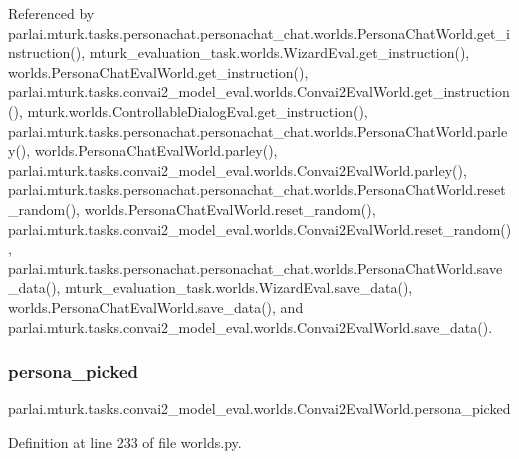 Referenced by parlai.\+mturk.\+tasks.\+personachat.\+personachat\+\_\+chat.\+worlds.\+Persona\+Chat\+World.\+get\+\_\+instruction(), mturk\+\_\+evaluation\+\_\+task.\+worlds.\+Wizard\+Eval.\+get\+\_\+instruction(), worlds.\+Persona\+Chat\+Eval\+World.\+get\+\_\+instruction(), parlai.\+mturk.\+tasks.\+convai2\+\_\+model\+\_\+eval.\+worlds.\+Convai2\+Eval\+World.\+get\+\_\+instruction(), mturk.\+worlds.\+Controllable\+Dialog\+Eval.\+get\+\_\+instruction(), parlai.\+mturk.\+tasks.\+personachat.\+personachat\+\_\+chat.\+worlds.\+Persona\+Chat\+World.\+parley(), worlds.\+Persona\+Chat\+Eval\+World.\+parley(), parlai.\+mturk.\+tasks.\+convai2\+\_\+model\+\_\+eval.\+worlds.\+Convai2\+Eval\+World.\+parley(), parlai.\+mturk.\+tasks.\+personachat.\+personachat\+\_\+chat.\+worlds.\+Persona\+Chat\+World.\+reset\+\_\+random(), worlds.\+Persona\+Chat\+Eval\+World.\+reset\+\_\+random(), parlai.\+mturk.\+tasks.\+convai2\+\_\+model\+\_\+eval.\+worlds.\+Convai2\+Eval\+World.\+reset\+\_\+random(), parlai.\+mturk.\+tasks.\+personachat.\+personachat\+\_\+chat.\+worlds.\+Persona\+Chat\+World.\+save\+\_\+data(), mturk\+\_\+evaluation\+\_\+task.\+worlds.\+Wizard\+Eval.\+save\+\_\+data(), worlds.\+Persona\+Chat\+Eval\+World.\+save\+\_\+data(), and parlai.\+mturk.\+tasks.\+convai2\+\_\+model\+\_\+eval.\+worlds.\+Convai2\+Eval\+World.\+save\+\_\+data().

\mbox{\label{classparlai_1_1mturk_1_1tasks_1_1convai2__model__eval_1_1worlds_1_1Convai2EvalWorld_a747806364239c2320520755980c9166f}} 
\subsubsection{\texorpdfstring{persona\+\_\+picked}{persona\_picked}}
{\footnotesize\ttfamily parlai.\+mturk.\+tasks.\+convai2\+\_\+model\+\_\+eval.\+worlds.\+Convai2\+Eval\+World.\+persona\+\_\+picked}



Definition at line 233 of file worlds.\+py.



